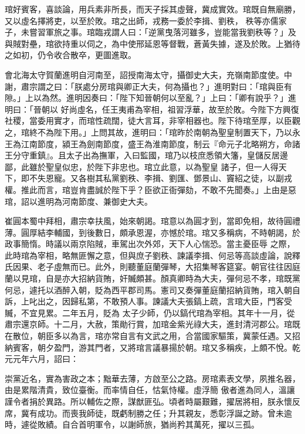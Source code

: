 \begin{pinyinscope}
 琯好賓客，喜談論，用兵素非所長，而天子採其虛聲，冀成實效。琯既自無廟勝，又以虛名擇將吏，以至於敗。琯之出師，戎務一委於李揖、劉秩，
 秩等亦儒家子，未嘗習軍旅之事。琯臨戎謂人曰：「逆黨曳落河雖多，豈能當我劉秩等？」及與賊對壘，琯欲持重以伺之，為中使邢延恩等督戰，蒼黃失據，遂及於敗。上猶待之如初，仍令收合散卒，更圖進取。



 會北海太守賀蘭進明自河南至，詔授南海太守，攝御史大夫，充嶺南節度使。中謝，肅宗謂之曰：「朕處分房琯與卿正大夫，何為攝也？」進明對曰：「琯與臣有隙。」上以為然。進明因奏曰：「陛下知晉朝何以至亂？」上曰：「卿有說乎？」進明曰：「晉朝以
 好尚虛名，任王夷甫為宰相，祖習浮華，故至於敗。今陛下方興復社稷，當委用實才，而琯性疏闊，徒大言耳，非宰相器也。陛下待琯至厚，以臣觀之，琯終不為陛下用。」上問其故，進明曰：「琯昨於南朝為聖皇制置天下，乃以永王為江南節度，潁王為劍南節度，盛王為淮南節度，制云『命元子北略朔方，命諸王分守重鎮』。且太子出為撫軍，入曰監國，琯乃以枝庶悉領大籓，皇儲反居邊鄙，此雖於聖皇似忠，於陛下非忠也。琯立此意，以為聖皇
 諸子，但一人得天下，即不失恩寵。又各樹其私黨劉秩、李揖、劉匯、鄧景山、竇紹之徒，以副戎權。推此而言，琯豈肯盡誠於陛下乎？臣欲正衙彈劾，不敢不先聞奏。」上由是惡琯，詔以進明為河南節度、兼御史大夫。



 崔圓本蜀中拜相，肅宗幸扶風，始來朝謁。琯意以為圓才到，當即免相，故待圓禮薄。圓厚結李輔國，到後數日，頗承恩渥，亦憾於琯。琯又多稱病，不時朝謁，於政事簡惰。時議以兩京陷賊，車駕出次外郊，天下人心惴恐。當主憂臣辱
 之際，此時琯為宰相，略無匪懈之意，但與庶子劉秩、諫議李揖、何忌等高談虛論，說釋氏因果、老子虛無而已。此外，則聽董庭蘭彈琴，大招集琴客筵宴。朝官往往因庭蘭以見琯，自是亦大招納貨賄，奸贓頗甚。顏真卿時為大夫，彈何忌不孝，琯既黨何忌，遽托以酒醉入朝，貶為西平郡司馬。憲司又奏彈董庭蘭招納貨賄，琯入朝自訴，上叱出之，因歸私第，不敢預人事。諫議大夫張鎬上疏，言琯大臣，門客受贓，不宜見累。二年五月，貶為
 太子少師，仍以鎬代琯為宰相。其年十一月，從肅宗還京師。十二月，大赦，策勛行賞，加琯金紫光祿大夫，進封清河郡公。琯既在散位，朝臣多以為言，琯亦常自言有文武之用，合當國家驅策，冀蒙任遇。又招納賓客，朝夕盈門，游其門者，又將琯言議暴揚於朝。琯又多稱疾，上頗不悅。乾元元年六月，詔曰：



 崇黨近名，實為害政之本；黜華去薄，方啟至公之路。房琯素表文學，夙推名器，由是累階清貴，致位臺衡。而率情自任，怙氣恃權。虛浮簡
 傲者進為同人，溫讓謹令者捐於異路。所以輔佐之際，謀猷匪弘。頃者時屬艱難，擢居將相，朕永懷反席，冀有成功。而喪我師徒，既虧制勝之任；升其親友，悉彰浮誕之跡。曾未逾時，遽從敗績。自合首明軍令，以謝師旅，猶尚矜其萬死，擢以三孤。




\end{pinyinscope}
